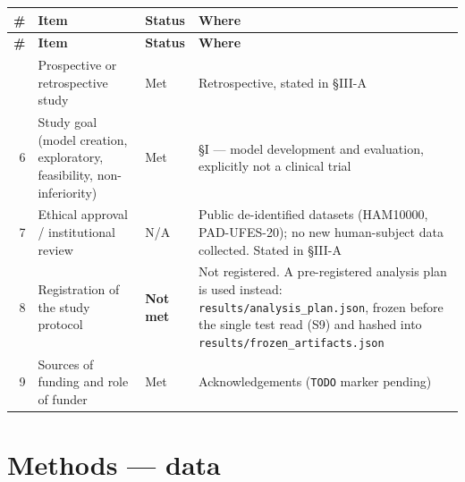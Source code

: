 \documentclass[10pt,a4paper]{article}
\begin{document}
\begin{longtable}{@{}rp{}lp{}@{}}
\toprule
\textbf{\#} & \textbf{Item} & \textbf{Status} & \textbf{Where} \\
\midrule
\endfirsthead
\toprule
\textbf{\#} & \textbf{Item} & \textbf{Status} & \textbf{Where} \\
\midrule
\endhead
\bottomrule
\endfoot
5 & Prospective or retrospective study & Met & Retrospective, stated in \S{}III-A \\
6 & Study goal (model creation, exploratory, feasibility, non-inferiority) & Met & \S{}I --- model development and evaluation, explicitly not a clinical trial \\
7 & Ethical approval / institutional review & N/A & Public de-identified datasets (HAM10000, PAD-UFES-20); no new human-subject data collected. Stated in \S{}III-A \\
8 & Registration of the study protocol & \textbf{Not met} & Not registered. A pre-registered analysis plan is used instead: \texttt{results/analysis\_plan.json}, frozen before the single test read (S9) and hashed into \texttt{results/frozen\_artifacts.json} \\
9 & Sources of funding and role of funder & Met & Acknowledgements (\texttt{TODO} marker pending) \\
\end{longtable}


\section*{Methods --- data}
\end{document}
